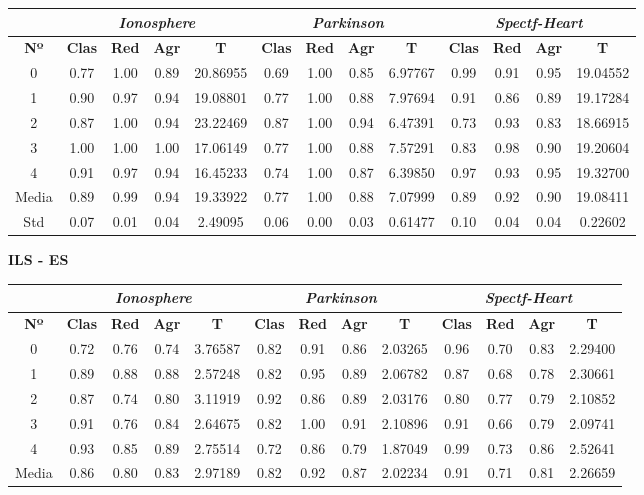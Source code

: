 \documentclass[10pt, a4paper]{article}
\theoremstyle{theorem-style}
\theoremstyle{theorem-style}
\theoremstyle{theorem2-style}
\theoremstyle{definition-style}
\theoremstyle{remark-style}
\theoremstyle{example-style}
\theoremstyle{definition-style}
\theoremstyle{remark-style}
\theoremstyle{remark-style}
\begin{document}
\begin{table}[ht!]
\begin{tabular}{ccccc|cccc|cccc}
\centering
 & \multicolumn{4}{c}{\textit{Ionosphere}} & \multicolumn{4}{c}{\textit{Parkinson}} & \multicolumn{4}{c}{\textit{Spectf-Heart}} \\ \hline
\textbf{Nº} & \textbf{Clas} & \textbf{Red} & \textbf{Agr} & \textbf{T} & \textbf{Clas} & \textbf{Red} & \textbf{Agr} & \textbf{T} & \textbf{Clas} & \textbf{Red} & \textbf{Agr} & \textbf{T} \\ \hline
0&	 0.77 & 1.00 & 0.89 & 20.86955 & 	0.69 & 1.00 & 0.85 & 6.97767 & 0.99 & 0.91 & 0.95 & 19.04552 \\ 
1&	 0.90 & 0.97 & 0.94 & 19.08801 & 	0.77 & 1.00 & 0.88 & 7.97694 & 0.91 & 0.86 & 0.89 & 19.17284 \\ 
2&	 0.87 & 1.00 & 0.94 & 23.22469 & 	0.87 & 1.00 & 0.94 & 6.47391 & 0.73 & 0.93 & 0.83 & 18.66915 \\ 
3&	 1.00 & 1.00 & 1.00 & 17.06149 & 	0.77 & 1.00 & 0.88 & 7.57291 & 0.83 & 0.98 & 0.90 & 19.20604 \\ 
4&	 0.91 & 0.97 & 0.94 & 16.45233 & 	0.74 & 1.00 & 0.87 & 6.39850 & 0.97 & 0.93 & 0.95 & 19.32700 \\
\hline 
Media&	 0.89 & 0.99 & 0.94 & 19.33922&	0.77 & 1.00 & 0.88 & 7.07999	&	0.89 & 0.92 & 0.90 & 19.08411
 \\ Std&	 0.07 & 0.01 & 0.04 & 2.49095&	0.06 & 0.00 & 0.03 & 0.61477	&	0.10 & 0.04 & 0.04 & 0.22602
 \\ 
\end{tabular}
\end{table}

\pagebreak
\textbf{ILS - ES}

\begin{table}[ht!]
\begin{tabular}{ccccc|cccc|cccc}
\centering
 & \multicolumn{4}{c}{\textit{Ionosphere}} & \multicolumn{4}{c}{\textit{Parkinson}} & \multicolumn{4}{c}{\textit{Spectf-Heart}} \\ \hline
\textbf{Nº} & \textbf{Clas} & \textbf{Red} & \textbf{Agr} & \textbf{T} & \textbf{Clas} & \textbf{Red} & \textbf{Agr} & \textbf{T} & \textbf{Clas} & \textbf{Red} & \textbf{Agr} & \textbf{T} \\ \hline
0&	 0.72 & 0.76 & 0.74 & 3.76587 & 	0.82 & 0.91 & 0.86 & 2.03265 & 0.96 & 0.70 & 0.83 & 2.29400 \\ 
1&	 0.89 & 0.88 & 0.88 & 2.57248 & 	0.82 & 0.95 & 0.89 & 2.06782 & 0.87 & 0.68 & 0.78 & 2.30661 \\ 
2&	 0.87 & 0.74 & 0.80 & 3.11919 & 	0.92 & 0.86 & 0.89 & 2.03176 & 0.80 & 0.77 & 0.79 & 2.10852 \\ 
3&	 0.91 & 0.76 & 0.84 & 2.64675 & 	0.82 & 1.00 & 0.91 & 2.10896 & 0.91 & 0.66 & 0.79 & 2.09741 \\ 
4&	 0.93 & 0.85 & 0.89 & 2.75514 & 	0.72 & 0.86 & 0.79 & 1.87049 & 0.99 & 0.73 & 0.86 & 2.52641 \\ 
\hline
Media&	 0.86 & 0.80 & 0.83 & 2.97189	&0.82 & 0.92 & 0.87 & 2.02234	&	0.91 & 0.71 & 0.81 & 2.26659
\end{tabular}
\end{table}
\end{document}
